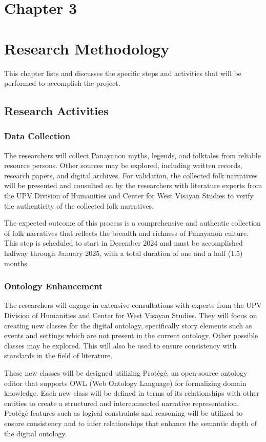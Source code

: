 \section*{Chapter 3}
\section{Research Methodology}
This chapter lists and discusses the specific steps and activities that will be performed  to accomplish the project. 

\subsection{Research Activities}

\subsubsection{Data Collection} 
    The researchers will collect Panayanon myths, legends, and folktales from reliable resource persons. Other sources may be explored, including written records, research papers, and digital archives. For validation, the collected folk narratives will be presented and consulted on by the researchers with literature experts from the UPV Division of Humanities and Center for West Visayan Studies to verify the authenticity of the collected folk narratives. 
    
    The expected outcome of this process is a comprehensive and authentic collection of folk narratives that reflects the breadth and richness of Panayanon culture. This step is scheduled to start in December 2024 and must be accomplished halfway through January 2025, with a total duration of one and a half (1.5) months.
    
\subsubsection{Ontology Enhancement} 
    The researchers will engage in extensive consultations with experts from the UPV Division of Humanities and Center for West Visayan Studies. They will focus on creating new classes for the digital ontology,  specifically story elements such as events and settings which are not present in the current ontology. Other possible classes may be explored. This will also be used to ensure consistency with standards in the field of literature.
    
    These new classes will be designed utilizing Protégé, an open-source ontology editor that supports OWL (Web Ontology Language) for formalizing domain knowledge. Each new class will be defined in terms of its relationships with other entities to create a structured and interconnected narrative representation. Protégé features such as logical constraints and reasoning will be utilized to ensure consistency and to infer relationships that enhance the semantic depth of the digital ontology.
    
